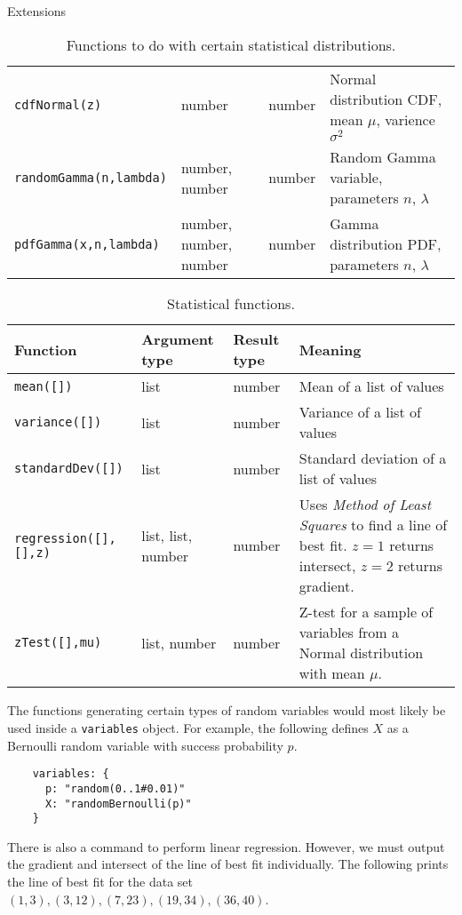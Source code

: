 \begin{chapter}{\label{cha:extensions}Extensions}
\begin{sidewaystable}[ht]
\begin{tabular}{lllp{20em}}
  		\verb"cdfNormal(z)" & number & number & Normal distribution CDF, mean $\mu$, varience $\sigma^2$ \\
      \verb"randomGamma(n,lambda)" & number, number & number & Random Gamma variable, parameters $n$, $\lambda$ \\
      \verb"pdfGamma(x,n,lambda)" & number, number, number & number & Gamma distribution PDF, parameters $n$, $\lambda$ \\
      \hline\hline
  	\end{tabular}
  	\caption{\label{tab:statsfunctions1}
  		Functions to do with certain statistical distributions.
  	}
  \end{sidewaystable}
  
  \begin{sidewaystable}[ht]
  	\centering
  	\begin{tabular}{lllp{20em}}
  		\hline
  		Function & Argument type & Result type & Meaning \\
  		\hline
      \verb"mean([])"	& list & number	& Mean of a list of values \\
      \verb"variance([])" & list & number & Variance of a list of values \\
      \verb"standardDev([])" & list & number & Standard deviation of a list of values \\
      \verb"regression([],[],z)" & list, list, number & number & Uses \emph{Method of Least Squares} to find a line of best fit. 
      $z = 1$ returns intersect, $z = 2$ returns gradient. \\ 
      \verb"zTest([],mu)" & list, number & number & Z-test for a sample of variables from a Normal distribution with mean $\mu$.\\
      \hline\hline
  	\end{tabular}
  	\caption{\label{tab:statsfunctions2}
  		Statistical functions.
  	}
  \end{sidewaystable}
  
  The functions generating certain types of random variables would most likely be used inside a \verb"variables" object. For example, 
  the following defines $X$ as a Bernoulli random variable with success probability $p$.
  
  \begin{Verbatim}
    variables: {
      p: "random(0..1#0.01)"
      X: "randomBernoulli(p)"
    }
  \end{Verbatim}
  
  There is also a command to perform linear regression. However, we must output the gradient and intersect of the line of best fit individually.
  The following prints the line of best fit for the data set $(1,3), (3,12), (7,23), (19,34), (36,40)$.
  

\end{chapter}
